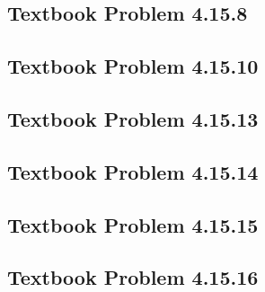 \documentclass[12pt]{article}
\begin{document}
\subsection{Textbook Problem 4.15.8}
\subsection{Textbook Problem 4.15.10}
\subsection{Textbook Problem 4.15.13}
\subsection{Textbook Problem 4.15.14}
\subsection{Textbook Problem 4.15.15}
\subsection{Textbook Problem 4.15.16}
\end{document}
